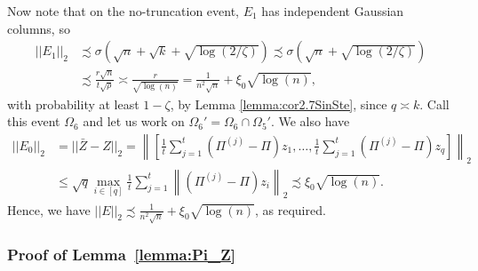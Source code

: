 \documentclass{article}
\begin{document}
Now note that on the no-truncation event, $E_1$ has independent Gaussian columns, so
\begin{align*}
||E_1||_2 & \precsim \sigma(\sqrt{n} + \sqrt{k} + \sqrt{\log(2/\zeta)}) \precsim \sigma(\sqrt{n} + \sqrt{\log(2/\zeta)}) \\
%
& \precsim \frac{r\sqrt{n}}{t\sqrt{\rho}} \asymp \frac{r}{\sqrt{\log(n)}} =\frac{1}{n^2\sqrt{n}} + \xi_0\sqrt{\log(n)},
\end{align*}
with probability at least $1 - \zeta$, by Lemma \ref{lemma:cor2.7SinSte}, since $q \asymp k$. Call this event $\Omega_6$ and let us work on $\Omega_6' = \Omega_6 \cap \Omega_5'$. We also have
\begin{align*}
||E_0||_2 &= ||\bar{Z} - Z||_2 = \left\|\left[\frac{1}{t}\sum_{j = 1}^t(\Pi^{(j)} - \Pi)z_1, \dots ,\frac{1}{t}\sum_{j = 1}^t(\Pi^{(j)} - \Pi)z_q\right]\right\|_2 \\
%
& \leq \sqrt{q}\mathop{\max}\limits_{i \in [q]}\frac{1}{t}\sum_{j = 1}^t\left\|(\Pi^{(j)} - \Pi)z_i\right\|_2 \precsim \xi_0\sqrt{\log(n)}.
\end{align*}
Hence, we have $||E||_2 \precsim \frac{1}{n^2\sqrt{n}} + \xi_0\sqrt{\log(n)}$, as required.


\subsubsection{Proof of Lemma~\ref{lemma:Pi_Z}}
\label{AppLemPiZ}
\end{document}
